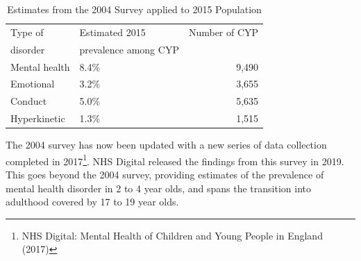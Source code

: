 \begin{table}[hbt]
    \caption{Estimates from the 2004 Survey applied to 2015 Population}
    \centering
    \begin{tabular}{llr}
    \toprule
    Type of & Estimated 2015 & Number of CYP \\
    disorder & prevalence among CYP & \ \\
    \midrule
    Mental health & 8.4\% & 9,490 \\
    Emotional & 3.2\% & 3,655 \\
    Conduct & 5.0\% & 5,635 \\
    Hyperkinetic & 1.3\% & 1,515 \\
    \bottomrule
    \end{tabular}
    \label{tab:yp:mh1}
\end{table}

The 2004 survey has now been updated with a new series of data collection completed in 2017\footnote{NHS Digital: Mental Health of Children and Young People in England (2017)}. NHS Digital released the findings from this survey in 2019. This goes beyond the 2004 survey, providing estimates of the prevalence of mental health disorder in 2 to 4 year olds, and spans the transition into adulthood covered by 17 to 19 year olds.

